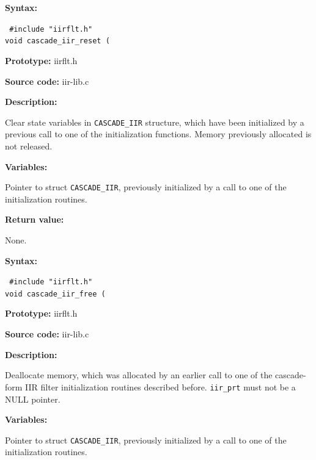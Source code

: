 
{\bf Syntax: }

{\tt
\#include "iirflt.h"\\
void cascade\_iir\_reset (
}

{\bf Prototype: }    iirflt.h

{\bf Source code: }  iir-lib.c

{\bf Description: }

Clear state variables in {\tt CASCADE\_IIR} structure, which have been
initialized by a previous call to one of the initialization
functions. Memory previously allocated is not released.

{\bf Variables: }
\begin{Descr}{\DescrLen}
\item[\pbox{20mm}{\em iir\_ptr}] %
        Pointer to struct {\tt CASCADE\_IIR}, previously initialized
        by a call to one of the initialization routines.
\end{Descr}

{\bf Return value: }

None.

\newpage


{\bf Syntax: }

{\tt
\#include "iirflt.h"\\
void cascade\_iir\_free (
}

{\bf Prototype: }    iirflt.h

{\bf Source code: }  iir-lib.c

{\bf Description: }

Deallocate memory, which was allocated by an earlier call to one of
the cascade-form IIR filter initialization routines described before.
{\tt iir\_prt} must not be a NULL pointer.

{\bf Variables: }
\begin{Descr}{\DescrLen}
\item[\pbox{20mm}{\em iir\_ptr}] %
        Pointer to struct {\tt CASCADE\_IIR}, previously initialized
        by a call to one of the initialization routines.
\end{Descr}



